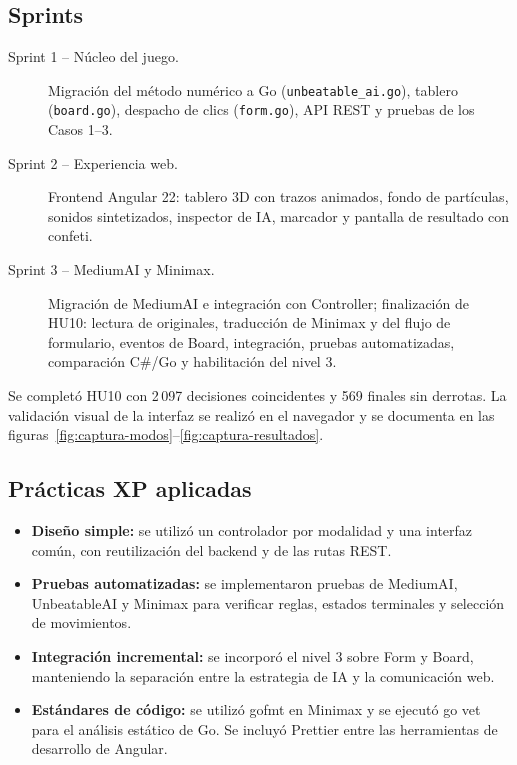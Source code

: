 \documentclass[12pt,a4paper]{article}
\begin{document}
\subsection{Sprints}
\begin{description}
  \item[Sprint 1 -- Núcleo del juego.] Migración del método numérico a Go
        (\texttt{unbeatable\_ai.go}), tablero (\texttt{board.go}), despacho de clics
        (\texttt{form.go}), API REST y pruebas de los Casos 1--3.
  \item[Sprint 2 -- Experiencia web.] Frontend Angular 22: tablero 3D con
        trazos animados, fondo de partículas, sonidos sintetizados, inspector
        de IA, marcador y pantalla de resultado con confeti.
  \item[Sprint 3 -- MediumAI y Minimax.] Migración de MediumAI e integración con
        Controller; finalización de HU10: lectura de originales, traducción de
        Minimax y del flujo de formulario, eventos de Board, integración,
        pruebas automatizadas, comparación C\#/Go y habilitación del nivel 3.
\end{description}
Se completó HU10 con 2\,097 decisiones coincidentes y 569 finales sin derrotas.
La validación visual de la interfaz se realizó en el navegador y se documenta en
las figuras~\ref{fig:captura-modos}--\ref{fig:captura-resultados}.

\subsection{Prácticas XP aplicadas}
\begin{itemize}
 \item \textbf{Diseño simple:} se utilizó un controlador por modalidad y una
       interfaz común, con reutilización del backend y de las rutas REST.
 \item \textbf{Pruebas automatizadas:} se implementaron pruebas de MediumAI, UnbeatableAI y Minimax para verificar reglas, estados terminales y selección de movimientos.
 \item \textbf{Integración incremental:} se incorporó el nivel 3 sobre Form y Board,
       manteniendo la separación entre la estrategia de IA y la comunicación web.
 \item \textbf{Estándares de código:} se utilizó gofmt en Minimax y se ejecutó
       go vet para el análisis estático de Go. Se incluyó Prettier entre las
       herramientas de desarrollo de Angular.
\end{itemize}
\end{document}
